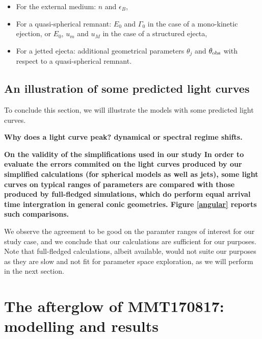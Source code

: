\begin{itemize}
	\item For the external medium: $n$ and $\epsilon_B$,
	\item For a quasi-spherical remnant: $E_0$ and $\Gamma_0$ in the case of a mono-kinetic ejection, or $E_0$, $u_m$ and $u_M$ in the case of a structured ejecta,
	\item For a jetted ejecta: additional geometrical parameters $\theta_j$ and $\theta_{\rm{obs}}$ with respect to a quasi-spherical remnant.

\end{itemize}

\subsection{An illustration of some predicted light curves}
To conclude this section, we will illustrate the models with some predicted light curves. 


\bf{Why does a light curve peak? } dynamical or spectral regime shifts.

\bf{On the validity of the simplifications used in our study}
In order to evaluate the errors commited on the light curves produced by our simplified calculations (for spherical models as well as jets), some light curves on typical ranges of parameters are compared with those produced by full-fledged simulations, which do perform equal arrival time intergration in general conic geometries. Figure \ref{angular} reports such comparisons.


We observe the agreement to be good on the paramter ranges of interest for our study case, and we conclude that our calculations are sufficient for our purposes. Note that full-fledged calculations, albeit available, would not suite our purposes as they are slow and not fit for parameter space exploration, as we will perform in the next section.

\section{The afterglow of MMT170817: modelling and results}

